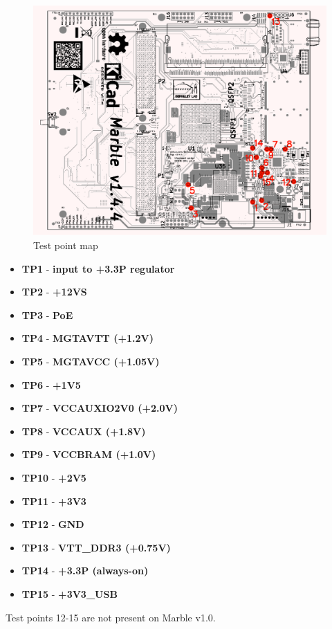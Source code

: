 \documentclass[12pt,oneside,a4]{article}
\begin{document}
\begin{figure}[H]
\begin{center}
\includegraphics[width=1\linewidth]{testpoint_map.pdf}
 \caption{Test point map}\label{testpoints}
\end{center}
\end{figure}

\begin{itemize}
	\item \textbf{TP1} - \textbf{input to +3.3P regulator}
	\item \textbf{TP2} - \textbf{+12VS}
	\item \textbf{TP3} - \textbf{PoE}
	\item \textbf{TP4} - \textbf{MGTAVTT (+1.2V)}
	\item \textbf{TP5} - \textbf{MGTAVCC (+1.05V)}
	\item \textbf{TP6} - \textbf{+1V5}
	\item \textbf{TP7} - \textbf{VCCAUXIO2V0 (+2.0V)}
	\item \textbf{TP8} - \textbf{VCCAUX (+1.8V)}
	\item \textbf{TP9} - \textbf{VCCBRAM (+1.0V)}
	\item \textbf{TP10} - \textbf{+2V5}
	\item \textbf{TP11} - \textbf{+3V3}
	\item \textbf{TP12} - \textbf{GND}
	\item \textbf{TP13} - \textbf{VTT\_DDR3 (+0.75V)}
	\item \textbf{TP14} - \textbf{+3.3P (always-on)}
	\item \textbf{TP15} - \textbf{+3V3\_USB}

\end{itemize}

Test points 12-15 are not present on Marble v1.0.

\begin{thebibliography}{99}
\end{thebibliography}
\end{document}
